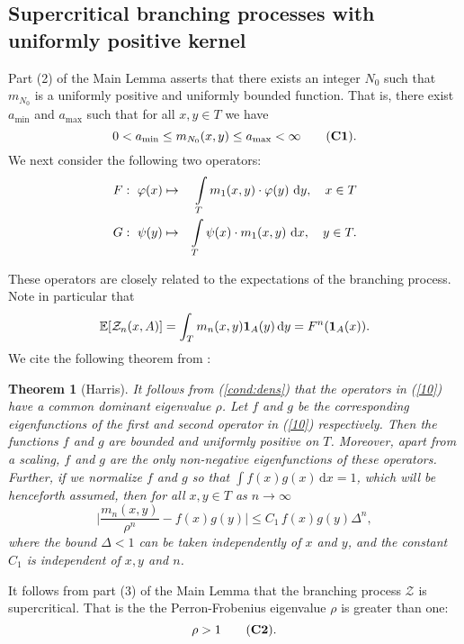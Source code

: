 \documentclass[amssymb,amsfonts,12pt,verbatim,righttag,oneside]{amsart}
\numberwithin{equation}{section} %
\theoremstyle{plain}
\newcommand*{\clrred}[1]{{\color{red} #1}}
\newcommand{\fm}{\ensuremath{\clrred{}}}
\newcommand*{\di}{\, \mathrm{d} }
\newcommand*{\ev}{\ensuremath{\mathbb{E}}}
\newcommand*{\ind}{\mathbf{1}}
\newcommand*{\Z}{\ensuremath{\mathcal{Z}}}
\newcommand*{\T}{\ensuremath{T}}
\newtheorem{theorem}{Theorem}
\theoremstyle{plain}
\begin{document}

\subsection{Supercritical branching processes with uniformly positive kernel}

Part (2) of the Main Lemma asserts  that there exists an integer
$N_0$ such that $m_{N_0}$ is a uniformly positive and uniformly bounded function. That is,
there exist $a_{\min}$ and $a_{\max} $ such that for all $x ,y\in \T$ we have
\begin{equation}\label{cond:dens}
0<a_{\min}\leq m_{N_0}(x ,y)\leq a_{\max}<\infty \tag{\textbf{C1}}.
\end{equation}
We next consider the following two operators:
\begin{eqnarray}\label{10}
&F:\ \varphi(x)\mapsto& \int\limits_{\T}m_1(x ,y)\cdot \varphi(y)\,\di y, \quad x\in T
\\
&G:\ \psi(y)\mapsto& \int\limits_{\T}\psi(x)\cdot m_1(x ,y)\, \di x, \quad y\in T.\notag
\end{eqnarray}


These operators are closely related to the expectations of the branching process. Note in particular that
\begin{equation}\label{eq:FandE}
\ev[\Z_n(x,A)]=\int_{T}m_n(x,y)\ind_A(y)\di y=F^n(\ind_A(x))\fm.
\end{equation}
We cite the following theorem from \cite[Theorem 10.1]{Harris63}:

\begin{theorem}[Harris]\label{Harris:10.1}
It follows from {\rm (\ref{cond:dens})} that the operators in {\rm (\ref{10})} have a
common dominant eigenvalue $\rho $. Let $f$ and $g$ be the
corresponding eigenfunctions of the first and second operator in
{\rm (\ref{10})} respectively. Then the functions $f$ and $g$
are bounded and uniformly positive on $T$. Moreover, apart from a scaling, $f$ and $g$ are
the only non-negative eigenfunctions of these operators. Further, if we normalize
$f$ and $g$ so that $\int f (x)g (x)\di x=1$, which will be
henceforth assumed, then for all  $x,y \in T$ as $n\to\infty$
$$
\Big|\frac{m_n(x,y)}{\rho^n}-f (x)g(y)\Big|\le C_1\,f (x)g (y)\Delta^n,
$$
\noindent where the bound $\Delta<1$ can be taken independently of $x$ and $y$,
and the constant $C_1$ is independent of $x,y$ and $n$.
\end{theorem}

It follows from part (3) of the Main Lemma that the branching process $\mathcal{Z}$ is supercritical. That is the
 the Perron-Frobenius eigenvalue $\rho$ is greater than one:
\begin{equation}\label{cond:rho}
\rho >1\tag{\textbf{C2}}.
\end{equation}
\end{document}
